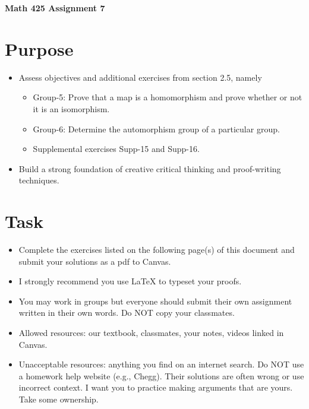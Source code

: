 \documentclass[12pt]{article}
\begin{document}
	\begin{center}
		{\Large \bf Math 425 Assignment 7}
	\end{center}
	\section*{Purpose}
	\begin{itemize}
		\item Assess objectives and additional exercises from section 2.5, namely
		\begin{itemize}
			\item Group-5: Prove that a map is a homomorphism and prove whether or not it is an isomorphism.
			\item Group-6: Determine the automorphism group of a particular group.
			\item Supplemental exercises Supp-15 and Supp-16.
		\end{itemize}
		\item Build a strong foundation of creative critical thinking and proof-writing techniques.
	\end{itemize}
	\section*{Task}
	\begin{itemize}
		\item Complete the exercises listed on the following page(s) of this document and submit your solutions as a pdf to Canvas.
		\item I strongly recommend you use LaTeX to typeset your proofs.
		\item You may work in groups but everyone should submit their own assignment written in their own words.  Do NOT copy your classmates.
		\item Allowed resources: our textbook, classmates, your notes, videos linked in Canvas.
		\item Unacceptable resources: anything you find on an internet search. Do NOT use a homework help website (e.g., Chegg). Their solutions are often wrong or use incorrect context.  I want you to practice making arguments that are yours. Take some ownership.
	\end{itemize}
\end{document}
